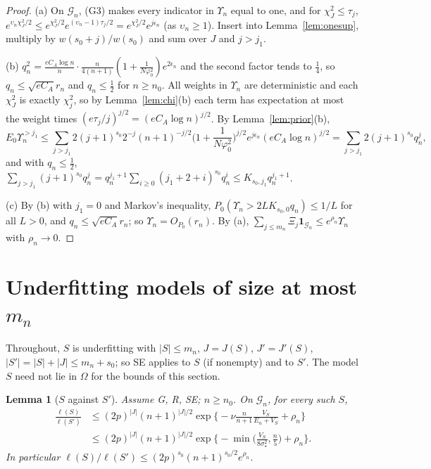 \documentclass[11pt]{article}
\newtheorem{lemma}[theorem]{Lemma}
\theoremstyle{definition}
\newcommand{\Pp}{P_0}
\newcommand{\E}{E_0}
\newcommand{\1}{\mathbf 1}
\newcommand{\Gn}{\mathcal G_n}
\newcommand{\sst}{\sigma_\star^2}
\newcommand{\vp}{\varphi_0^2}
\begin{document}
\begin{proof}
(a) On $\Gn$, (G3) makes every indicator in $\Upsilon_n$ equal to one, and for $\chi^2_J\le\tau_j$, $e^{\upsilon_n\chi^2_J/2}\le e^{\chi^2_J/2}e^{(\upsilon_n-1)\tau_j/2}=e^{\chi^2_J/2}e^{j\epsilon_n}$ (as $\upsilon_n\ge1$). Insert into Lemma~\ref{lem:onesup}, multiply by $w(s_0+j)/w(s_0)$ and sum over $J$ and $j>j_1$.

(b) $q_n^2=\frac{eC_A\log n}{n}\cdot\frac{n}{4(n+1)}(1+\frac1{N\vp})e^{2\epsilon_n}$ and the second factor tends to $\frac14$, so $q_n\le\sqrt{eC_A}r_n$ and $q_n\le\frac12$ for $n\ge n_0$. All weights in $\Upsilon_n$ are deterministic and each $\chi^2_J$ is exactly $\chi^2_j$, so by Lemma~\ref{lem:chi}(b) each term has expectation at most the weight times $(e\tau_j/j)^{j/2}=(eC_A\log n)^{j/2}$. By Lemma~\ref{lem:prior}(b),
\[
\E \Upsilon_n^{>j_1}\le\sum_{j>j_1}2(j+1)^{s_0}2^{-j}(n+1)^{-j/2}\Big(1+\frac1{N\vp}\Big)^{j/2}e^{j\epsilon_n}(eC_A\log n)^{j/2}=\sum_{j>j_1}2(j+1)^{s_0}q_n^j,
\]
and with $q_n\le\frac12$, $\sum_{j>j_1}(j+1)^{s_0}q_n^j=q_n^{j_1+1}\sum_{i\ge0}(j_1+2+i)^{s_0}q_n^i\le K_{s_0,j_1}q_n^{j_1+1}$.

(c) By (b) with $j_1=0$ and Markov's inequality, $\Pp(\Upsilon_n>2LK_{s_0,0}q_n)\le1/L$ for all $L>0$, and $q_n\le\sqrt{eC_A}r_n$; so $\Upsilon_n=O_{\Pp}(r_n)$. By (a), $\sum_{j\le m_n}\Xi_j\1_{\Gn}\le e^{\rho_n}\Upsilon_n$ with $\rho_n\to0$.
\end{proof}

\section{Underfitting models of size at most \texorpdfstring{$m_n$}{m\_n}}\label{sec:under}

Throughout, $S$ is underfitting with $|S|\le m_n$, $J=J(S)$, $J'=J'(S)$, $|S'|=|S|+|J|\le m_n+s_0$; so SE applies to $S$ (if nonempty) and to $S'$. The model $S$ need not lie in $\Omega$ for the bounds of this section.

\begin{lemma}[$S$ against $S'$]\label{lem:SvsSp}
Assume G, R, SE; $n\ge n_0$. On $\Gn$, for every such $S$,
\[
\begin{aligned}\frac{\ell(S)}{\ell(S')}&\le(2p)^{|J|}(n+1)^{|J|/2}\exp\Big\{-\nu\frac n{n+1}\frac{V_S}{E_n+V_S}+\rho_n\Big\}\\&\le(2p)^{|J|}(n+1)^{|J|/2}\exp\Big\{-\min\Big(\frac{V_S}{8\sst},\frac n5\Big)+\rho_n\Big\}.\end{aligned}
\]
In particular $\ell(S)/\ell(S')\le(2p)^{s_0}(n+1)^{s_0/2}e^{\rho_n}$.
\end{lemma}
\end{document}
